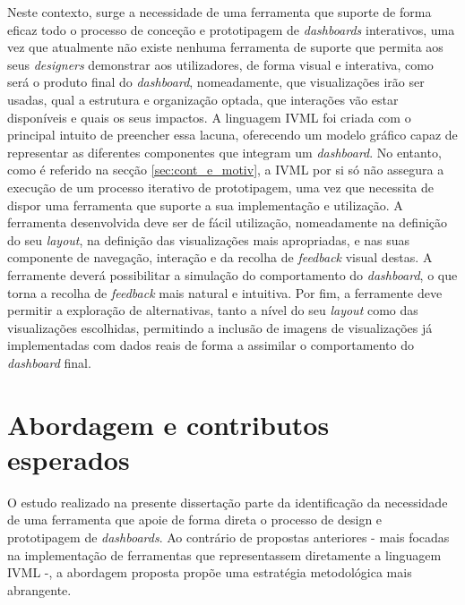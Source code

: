 Neste contexto, surge a necessidade de uma ferramenta que suporte de forma eficaz todo o processo de conceção e prototipagem de \textit{dashboards} interativos, uma vez que atualmente não existe nenhuma ferramenta de suporte que permita aos seus \textit{designers} demonstrar aos utilizadores, de forma visual e interativa, como será o produto final do \textit{dashboard}, nomeadamente, que visualizações irão ser usadas, qual a estrutura e organização optada, que interações vão estar disponíveis e quais os seus impactos. A linguagem \gls{IVML} foi criada com o principal intuito de preencher essa lacuna, oferecendo um modelo gráfico capaz de representar as diferentes componentes que integram um \textit{dashboard}. No entanto, como é referido na secção \ref{sec:cont_e_motiv}, a \gls{IVML} por si só não assegura a execução de um processo iterativo de prototipagem, uma vez que necessita de dispor uma ferramenta que suporte a sua implementação e utilização. A ferramenta desenvolvida deve ser de fácil utilização, nomeadamente na definição do seu \textit{layout}, na definição das visualizações mais apropriadas, e nas suas componente de navegação, interação e da recolha de \textit{feedback} visual destas. A ferramente deverá possibilitar a simulação do comportamento do \textit{dashboard}, o que torna a recolha de \textit{feedback} mais natural e intuitiva. Por fim, a ferramente deve permitir a exploração de alternativas, tanto a nível do seu \textit{layout} como das visualizações escolhidas, permitindo a inclusão de imagens de visualizações já implementadas com dados reais de forma a assimilar o comportamento do \textit{dashboard} final.

\section{Abordagem e contributos esperados}
\label{sec:contribuicoes}

O estudo realizado na presente dissertação parte da identificação da necessidade de uma ferramenta que apoie de forma direta o processo de design e prototipagem de \textit{dashboards}. Ao contrário de propostas anteriores - mais focadas na implementação de ferramentas que representassem diretamente a linguagem \gls{IVML} -, a abordagem proposta propõe uma estratégia metodológica mais abrangente.

